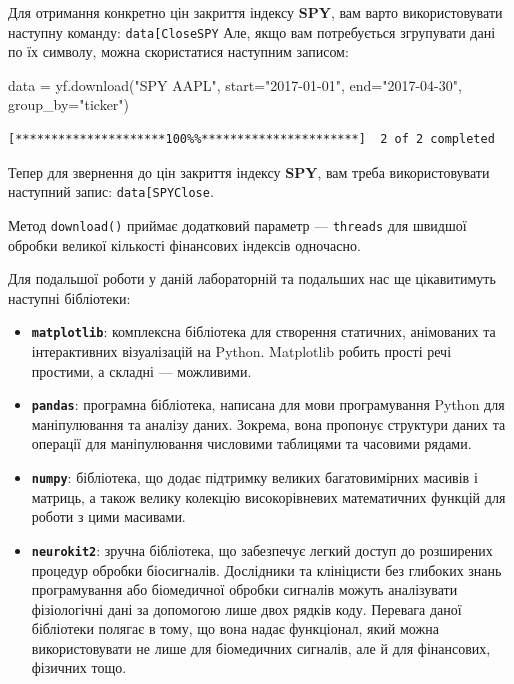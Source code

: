 \documentclass[
  letterpaper,
]{report}
\newenvironment{Shaded}{\begin{snugshade}}{\end{snugshade}}
\newcommand{\NormalTok}[1]{\textcolor[rgb]{0.00,0.23,0.31}{#1}}
\newcommand{\OperatorTok}[1]{\textcolor[rgb]{0.37,0.37,0.37}{#1}}
\newcommand{\StringTok}[1]{\textcolor[rgb]{0.13,0.47,0.30}{#1}}
\providecommand{\tightlist}{%
  \setlength{\itemsep}{0pt}\setlength{\parskip}{0pt}}\usepackage{longtable,booktabs,array}
\begin{document}
Для отримання конкретно цін закриття індексу \textbf{SPY}, вам варто
використовувати наступну команду:
\texttt{data{[}\textquotesingle{}Close\textquotesingle{}{]}{[}\textquotesingle{}SPY\textquotesingle{}{]}}
Але, якщо вам потребується згрупувати дані по їх символу, можна
скористатися наступним записом:

\begin{Shaded}
\begin{Highlighting}[]
\NormalTok{data }\OperatorTok{=}\NormalTok{ yf.download(}\StringTok{"SPY AAPL"}\NormalTok{, }
\NormalTok{                   start}\OperatorTok{=}\StringTok{"2017{-}01{-}01"}\NormalTok{, }
\NormalTok{                   end}\OperatorTok{=}\StringTok{"2017{-}04{-}30"}\NormalTok{,}
\NormalTok{                   group\_by}\OperatorTok{=}\StringTok{"ticker"}\NormalTok{)}
\end{Highlighting}
\end{Shaded}

\begin{verbatim}
[*********************100%%**********************]  2 of 2 completed
\end{verbatim}

Тепер для звернення до цін закриття індексу \textbf{SPY}, вам треба
використовувати наступний запис:
\texttt{data{[}\textquotesingle{}SPY\textquotesingle{}{]}{[}\textquotesingle{}Close\textquotesingle{}{]}}.

Метод \texttt{download()} приймає додатковий параметр ---
\texttt{threads} для швидшої обробки великої кількості фінансових
індексів одночасно.

Для подальшої роботи у даній лабораторній та подальших нас ще
цікавитимуть наступні бібліотеки:

\begin{itemize}
\tightlist
\item
  \textbf{\texttt{matplotlib}}: комплексна бібліотека для створення
  статичних, анімованих та інтерактивних візуалізацій на Python.
  Matplotlib робить прості речі простими, а складні --- можливими.
\item
  \textbf{\texttt{pandas}}: програмна бібліотека, написана для мови
  програмування Python для маніпулювання та аналізу даних. Зокрема, вона
  пропонує структури даних та операції для маніпулювання числовими
  таблицями та часовими рядами.
\item
  \textbf{\texttt{numpy}}: бібліотека, що додає підтримку великих
  багатовимірних масивів і матриць, а також велику колекцію
  високорівневих математичних функцій для роботи з цими масивами.
\item
  \textbf{\texttt{neurokit2}}: зручна бібліотека, що забезпечує легкий
  доступ до розширених процедур обробки біосигналів. Дослідники та
  клініцисти без глибоких знань програмування або біомедичної обробки
  сигналів можуть аналізувати фізіологічні дані за допомогою лише двох
  рядків коду. Перевага даної бібліотеки полягає в тому, що вона надає
  функціонал, який можна використовувати не лише для біомедичних
  сигналів, але й для фінансових, фізичних тощо.
\end{itemize}
\end{document}
